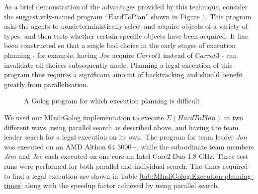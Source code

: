 As a brief demonstration of the advantages provided by this technique,
consider the suggestively-named program {}``HardToPlan'' shown in
Figure \ref{fig:MIndiGolog:HardToPlan}. This program asks the agents
to nondeterministically select and acquire objects of a variety of
types, and then tests whether certain specific objects have been acquired.
It has been constructed so that a single bad choice in the early stages
of execution planning - for example, having $Joe$ acquire $Carrot1$
instead of $Carrot3$ - can invalidate all choices subsequently made.
Planning a legal execution of this program thus requires a significant
amount of backtracking and should benefit greatly from parallelisation.

%
\begin{figure}[!t]
 

\begin{centering}
\par\end{centering}

\caption{A Golog program for which execution planning is difficult\label{fig:MIndiGolog:HardToPlan}}

\end{figure}


We used our MIndiGolog implementation to execute $\Sigma(HardToPlan)$
in two different ways: using parallel search as described above, and
having the team leader search for a legal execution on its own. The
program for team leader $Jon$ was executed on an AMD Althon 64 3000+,
while the subordinate team members $Jim$ and $Joe$ each executed
on one core an Intel Core2 Duo 1.8 GHz. Three test runs were performed
for both parallel and individual search. The times required to find
a legal execution are shown in Table \ref{tab:MIndiGolog:Execution-planning-times}
along with the speedup factor achieved by using parallel search.

